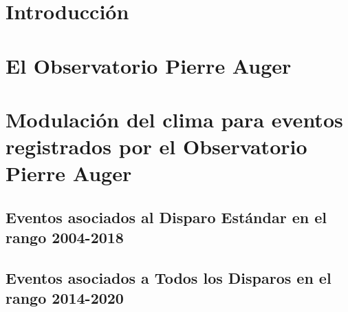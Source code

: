 \documentclass[12pt,papel,oneside]{ibtesis}
\begin{document}
 \chapter{Introducción}
	\graphicspath{{../01_Introduccion/}}
	
  
 \chapter{El Observatorio Pierre Auger}
	\graphicspath{{../02_IntroduccionAuger/}}
	

	\graphicspath{{../03_IntroduccionReport/}}
	

\chapter{Modulación del clima para eventos registrados por el Observatorio Pierre Auger}

	\section{Eventos asociados al Disparo Estándar en el rango 2004-2018}\label{Stan_modulacion}	
	\graphicspath{{../04_Clima/}}
	
	

	\section{Eventos asociados a Todos los Disparos en el rango 2014-2020 }	\label{ALL_modulacion}
	\graphicspath{{../05_Weather_Modulation/}}
	

	
\end{document}
